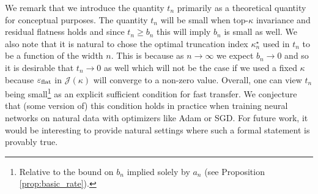 \documentclass{article} %
\newcommand{\hptrunc}{\kappa}
\newcommand{\epsflat}{\eps_{\mathrm{flat}}}
\newcommand{\decompobj}{\mathcal{J}}
\begin{document}
We remark that we introduce the quantity $t_n$ primarily as a theoretical quantity for conceptual purposes. The quantity $t_n$ will be small when top-$\hptrunc$ invariance and residual flatness holds and since $t_n \geq b_n$ this will imply $b_n$ is small as well. We also note that it is natural to chose the optimal truncation index $\hptrunc^\star_n$ used in $t_n$ to be a function of the width $n$. This is because as $n \to \infty$ we expect $b_n \to 0$ and so it is desirable that $t_n \to 0$ as well which will not be the case if we used a fixed $\hptrunc$ because $\epsflat$ in $\decompobj(\hptrunc)$ will converge to a non-zero value. Overall, one can view $t_n$ being small\footnote{Relative to the bound on $b_n$ implied solely by $a_n$ (see Proposition \ref{prop:basic_rate}).} as an explicit sufficient condition for fast transfer. We conjecture that (some version of) this condition holds in practice when training neural networks on natural data with optimizers like Adam or SGD. For future work, it would be interesting to provide natural settings where such a formal statement is provably true.
\end{document}
